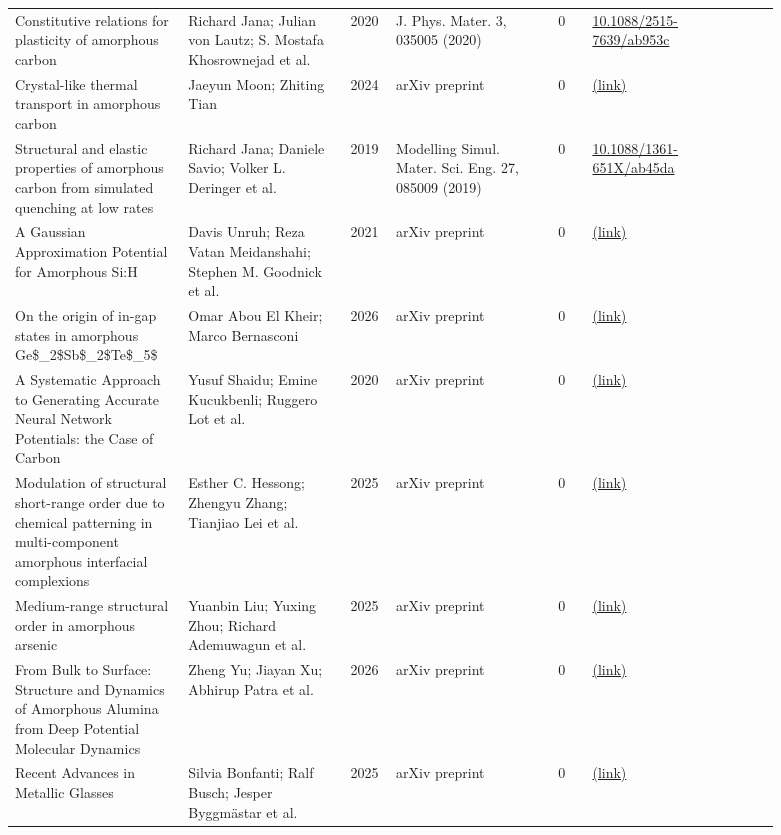 \documentclass[10pt,a4paper]{article}
\begin{document}
{\begin{longtable}{p{0.192\linewidth}p{0.192\linewidth}p{0.043\linewidth}p{0.192\linewidth}p{0.043\linewidth}p{0.132\linewidth}p{0.096\linewidth}}
Constitutive relations for plasticity of amorphous carbon & Richard Jana; Julian von Lautz; S. Mostafa Khosrownejad et al. & 2020 & J. Phys. Mater. 3, 035005 (2020) & 0 & \href{https://doi.org/10.1088/2515-7639/ab953c}{10.1088/2515-7639/ab953c} &  \\
Crystal-like thermal transport in amorphous carbon & Jaeyun Moon; Zhiting Tian & 2024 & arXiv preprint & 0 & \href{http://arxiv.org/abs/2405.07298v1}{(link)} &  \\
Structural and elastic properties of amorphous carbon from simulated quenching at low rates & Richard Jana; Daniele Savio; Volker L. Deringer et al. & 2019 & Modelling Simul. Mater. Sci. Eng. 27, 085009 (2019) & 0 & \href{https://doi.org/10.1088/1361-651X/ab45da}{10.1088/1361-651X/ab45da} &  \\
A Gaussian Approximation Potential for Amorphous Si:H & Davis Unruh; Reza Vatan Meidanshahi; Stephen M. Goodnick et al. & 2021 & arXiv preprint & 0 & \href{http://arxiv.org/abs/2106.02946v3}{(link)} &  \\
On the origin of in-gap states in amorphous Ge\$\_2\$Sb\$\_2\$Te\$\_5\$ & Omar Abou El Kheir; Marco Bernasconi & 2026 & arXiv preprint & 0 & \href{http://arxiv.org/abs/2602.15446v1}{(link)} &  \\
A Systematic Approach to Generating Accurate Neural Network Potentials: the Case of Carbon & Yusuf Shaidu; Emine Kucukbenli; Ruggero Lot et al. & 2020 & arXiv preprint & 0 & \href{http://arxiv.org/abs/2011.04604v1}{(link)} &  \\
Modulation of structural short-range order due to chemical patterning in multi-component amorphous interfacial complexions & Esther C. Hessong; Zhengyu Zhang; Tianjiao Lei et al. & 2025 & arXiv preprint & 0 & \href{http://arxiv.org/abs/2509.06166v3}{(link)} &  \\
Medium-range structural order in amorphous arsenic & Yuanbin Liu; Yuxing Zhou; Richard Ademuwagun et al. & 2025 & arXiv preprint & 0 & \href{http://arxiv.org/abs/2509.02484v1}{(link)} &  \\
From Bulk to Surface: Structure and Dynamics of Amorphous Alumina from Deep Potential Molecular Dynamics & Zheng Yu; Jiayan Xu; Abhirup Patra et al. & 2026 & arXiv preprint & 0 & \href{http://arxiv.org/abs/2605.05361v1}{(link)} &  \\
Recent Advances in Metallic Glasses & Silvia Bonfanti; Ralf Busch; Jesper Byggmästar et al. & 2025 & arXiv preprint & 0 & \href{http://arxiv.org/abs/2512.16590v1}{(link)} &  \\

\end{longtable}}
\end{document}
